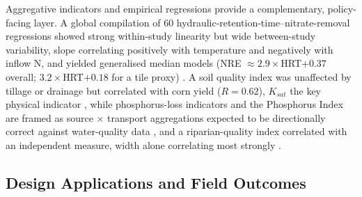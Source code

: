 Aggregative indicators and empirical regressions provide a complementary, policy-facing layer. A global compilation of 60 hydraulic-retention-time--nitrate-removal regressions showed strong within-study linearity but wide between-study variability, slope correlating positively with temperature and negatively with inflow N, and yielded generalised median models (NRE $\approx2.9\times$HRT$+0.37$ overall; $3.2\times$HRT$+0.18$ for a tile proxy) \parencite{Christianson2025c}. A soil quality index was unaffected by tillage or drainage but correlated with corn yield ($R=0.62$), $K_{sat}$ the key physical indicator \parencite{Nakajima2015}, while phosphorus-loss indicators and the Phosphorus Index are framed as source $\times$ transport aggregations expected to be directionally correct against water-quality data \parencite{Reid2018,Zhang2018}, and a riparian-quality index correlated with an independent measure, width alone correlating most strongly \parencite{Terrado2015}.

\subsection{Design Applications and Field Outcomes}

